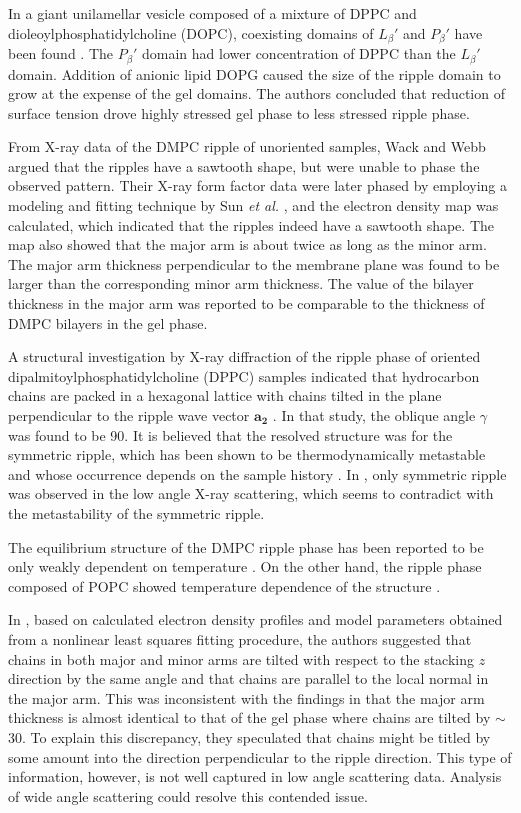 In a giant unilamellar vesicle composed of a mixture of DPPC and dioleoylphosphatidylcholine (\gls{DOPC}), 
coexisting domains of $L_\beta'$ and $P_\beta'$ have been found \cite{ref:Li06}.
The $P_\beta'$ domain had lower concentration of DPPC than the $L_\beta'$
domain. Addition of anionic lipid DOPG caused the size of the ripple domain
to grow at the expense of the gel domains. The authors concluded that reduction of 
surface tension drove highly stressed gel phase to less stressed ripple phase.

From X-ray data of the DMPC ripple of unoriented samples, 
Wack and Webb \cite{ref:Wack89} argued that the ripples have a sawtooth shape,
but were unable to phase the observed pattern.
Their X-ray form factor data were later
phased by employing a modeling and fitting technique by Sun \textit{et al.}
\cite{ref:Sun96}, and the electron density map was calculated, which indicated that  
the ripples indeed have a sawtooth shape. The map also showed that
the major arm is about twice as long as the minor arm. 
The major arm thickness perpendicular to the membrane plane 
was found to be larger than the corresponding minor arm thickness. 
The value of the bilayer thickness in the major arm was reported
to be comparable to the thickness of DMPC bilayers in the gel phase.

A structural investigation by X-ray diffraction of the ripple phase of
oriented dipalmitoylphosphatidylcholine (\gls{DPPC}) samples indicated that
hydrocarbon chains are packed in a hexagonal lattice with chains
tilted in the plane perpendicular to the ripple wave vector $\mathbf{a_2}$ \cite{ref:Hentschel91}.
In that study, the oblique angle $\gamma$ was found to be 90\textdegree.
It is believed that the resolved structure was for the symmetric ripple,
which has been shown to be thermodynamically metastable and whose occurrence
depends on the sample history \cite{ref:Katsaras00}. 
In \cite{ref:Hentschel91}, only symmetric ripple was observed in the low angle
X-ray scattering, which seems to contradict with the metastability of the
symmetric ripple.

The equilibrium structure of the DMPC ripple phase has been reported to be
only weakly dependent on temperature \cite{ref:Sengupta03}. 
On the other hand, the ripple phase composed of 
\gls{POPC} showed temperature dependence of the structure \cite{ref:Sengupta03}.

In \cite{ref:Sengupta03}, based on calculated electron density profiles 
and model parameters obtained from a nonlinear least squares fitting procedure, 
the authors suggested that chains in both major and minor arms are tilted with respect to 
the stacking $z$ direction by the same angle and that 
chains are parallel to the local normal in the major arm. 
This was inconsistent with the findings in \cite{ref:Sun96} that
the major arm thickness is almost identical to that of the gel phase where chains 
are tilted by $\sim$30\textdegree. To explain this discrepancy, 
they speculated that chains might be titled by some amount into the 
direction perpendicular to the ripple direction. 
This type of information, however, is not well captured in low angle scattering data.
Analysis of wide angle scattering could resolve this contended issue.



